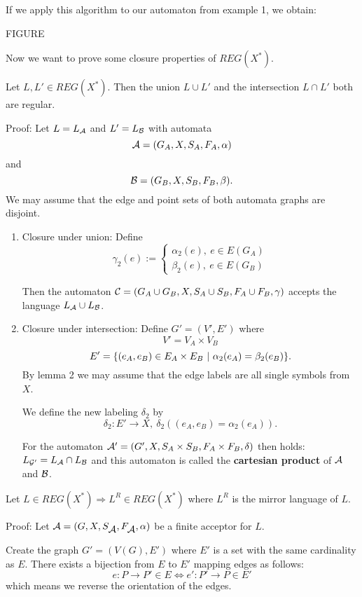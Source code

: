 If we apply this algorithm to our automaton from example 1, we obtain:

FIGURE

Now we want to prove some closure properties of $REG(X^*)$.

\begin{theorem}
Let $L, L' \in REG(X^*)$. Then the union $L \cup L'$ and the intersection $L
\cap L'$ both are regular.
\end{theorem}

Proof: Let $L = \mbox{$L_{\mathcal{A}}$}$ and $L' = \mbox{$L_{\mathcal{B}}$}$ with automata \[
\mbox{$\mathcal{A}$} = (G_A, X, S_A, F_A, \alpha) \] and \[ \mbox{$\mathcal{B}$} = (G_B, X, S_B,
F_B, \beta).\]
We may assume that the edge and point sets of both automata graphs are disjoint.

\begin{enumerate}
  \item Closure under union: Define
	\[ \gamma_2(e) := \left\{
		\begin{array}{l} 
		\alpha_2(e),\ e \in E(G_A) \\
		\beta_2(e),\ e \in E(G_B)
		\end{array}
	 \right. \]

	Then the automaton $\mbox{$\mathcal{C}$} = (G_A \cup G_B, X, S_A \cup S_B, F_A \cup
	F_B, \gamma)$ accepts the language $\mbox{$L_{\mathcal{A}}$} \cup \mbox{$L_{\mathcal{B}}$}$.
	
	\item Closure under intersection: Define $G' = (V', E')$ where
	\[ V' = V_A \times V_B \]
	\[ E' = \{ (e_A, e_B) \in E_A \times E_B \ |\  \alpha_2(e_A) = \beta_2(e_B)
		 \}. \]
	By lemma 2 we may assume that the edge labels are all single symbols from $X$.
	
	We define the new labeling $\delta_2$ by \[ \delta_2 : E' \to X,\
	\delta_2((e_A, e_B) = \alpha_2(e_A)). \]
	
	For the automaton $\mbox{$\mathcal{A'}$} = (G', X, S_A \times S_B, F_A \times F_B,
	\delta)$ then holds: $\mbox{$L_{\mathcal{G'}}$} = \mbox{$L_{\mathcal{A}}$} \cap \mbox{$L_{\mathcal{B}}$}$
	and this automaton is called the {\bf cartesian product} of $\mbox{$\mathcal{A}$}$ and
	$\mbox{$\mathcal{B}$}$.
\end{enumerate}

\begin{theorem}
Let $L \in REG(X^*) \Rightarrow L^R \in REG(X^*)$ where $L^R$ is the mirror
language of $L$.
\end{theorem}

Proof: Let $\mbox{$\mathcal{A}$} = (G, X, S_{\mbox{$\mathcal{A}$}}, F_{\mbox{$\mathcal{A}$}}, \alpha)$ be a
finite acceptor for $L$.

Create the graph $G' = (V(G), E')$ where $E'$ is a set with the same cardinality
as $E$. There exists a bijection from $E$ to $E'$ mapping edges as follows:
\[ e : P \to P' \in E \Leftrightarrow e' : P' \to P \in E' \]
which means we reverse the orientation of the edges.

